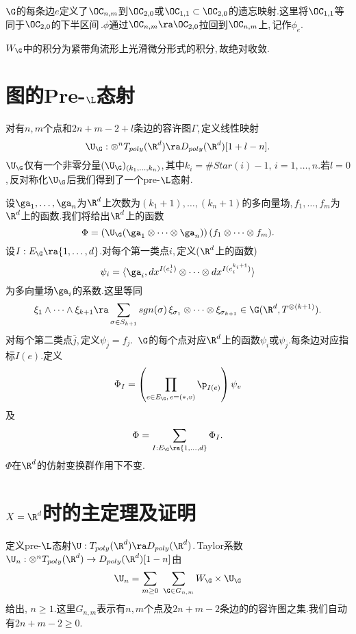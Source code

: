 $\G$的每条边$e$定义了$\OC_{n,m}$到$\OC_{2,0}$或$\OC_{1,1}\subset \OC_{2,0}$的遗忘映射.这里将$\OC_{1,1}$等同于$\OC_{2,0}$的下半区间\,.$\phi$通过$\OC_{n,m}\ra \OC_{2,0}$拉回到$\OC_{n,m}$上,\,记作$\phi_e$.

$W_\G$中的积分为紧带角流形上光滑微分形式的积分,\,故绝对收敛.



\section{图的Pre-$\L$态射}

对有$n,m$个点和$2n+m-2+l$条边的容许图$\Gamma$,\,定义线性映射
$$\U_\G:\otimes
        ^n T_{poly}(\R^d)\ra D_{poly}(\R^d)[1+l-n].$$
$\U_\G$仅有一个非零分量$(\U_\G)_{(k_1,\dots,k_n)}$,\,其中$k_i=\# Star(i)-1,\,i=1,\dots,n$.若$l=0$,\,反对称化$\U_\G$后我们得到了一个pre-$\L$态射.

设$\ga_1,\dots,\ga_n$为$\R^d$上次数为$(k_1+1),\dots,(k_n+1)$的多向量场,\,$f_1,\dots, f_m$为$\R^d$上的函数.我们将给出$\R^d$上的函数
$$\Phi=\left(
             { \U}_\G(\ga_1\otimes\dots\otimes
             \ga_n)\right)(f_1\otimes
             \dots \otimes f_m).$$
设$I:E_\G\ra \{1,\dots,d\}$.对每个第一类点$i$,\,定义($\R^d$上的函数)
$$\psi_i=\langle \ga_i, dx^{I(e^1_i)}\otimes\dots
                \otimes dx^{I(e^{k_i+1}_i)}\rangle$$
为多向量场$\ga_i$的系数.这里等同
$$\xi_1\wedge\dots\wedge\xi_{k+1}\ra
                 \sum_{\sigma\in S_{k+1}} sgn(\sigma)\,
                  \xi_{\sigma_1}\otimes\dots
                  \otimes \xi_{\sigma_{k+1}
                  }\in \G(\R^d,T^{\otimes(k+1)}).$$
对每个第二类点$\overline j$,\,定义$\psi_{\overline j}=f_j$.\,
$\G$的每个点对应$\R^d$上的函数$\psi_i$或$\psi_{\overline j}$.每条边对应指标$I(e)$.定义
$$\Phi_I=\left(\prod_{e\in E_\G,\,e=(*,v)}
               \p_{I(e)}\right) \psi_v$$
及
$$\Phi=\sum_{I:E_\G\ra \{1,\dots,d\}}\Phi_I.$$
$\Phi$在$\R^d$的仿射变换群作用下不变.



\section{$X=\R^d$时的主定理及证明}

定义pre-$\L$态射$\U:T_{poly}(\R^d)\ra D_{poly}(\R^d)$.\,Taylor系数\\
$\U_n:\otimes
        ^n T_{poly}(\R^d)\to D_{poly}(\R^d)[1-n]$由
$$\U_n=\sum_{m\ge 0} \,\, 
\sum_{\G\in G_{n,m}} 
W_\G \times \U_\G$$
给出,\,\,$n\ge 1$.这里$G_{n,m}$表示有$n,m$个点及$2n+m-2$条边的的容许图之集.我们自动有$2n+m-2\ge 0$.

